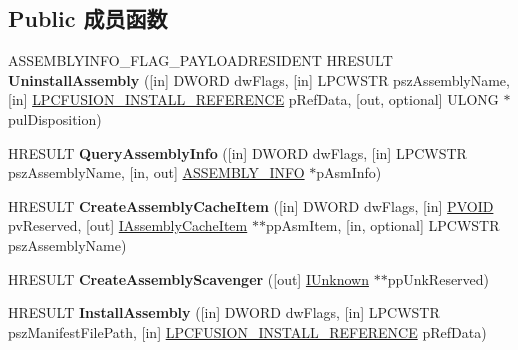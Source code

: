 \subsection*{Public 成员函数}
\begin{DoxyCompactItemize}
\item 
\mbox{\label{interface_i_assembly_cache_adfc9a0666bd7a4483c16d1b1a7648920}} 
A\+S\+S\+E\+M\+B\+L\+Y\+I\+N\+F\+O\+\_\+\+F\+L\+A\+G\+\_\+\+P\+A\+Y\+L\+O\+A\+D\+R\+E\+S\+I\+D\+E\+NT H\+R\+E\+S\+U\+LT {\bfseries Uninstall\+Assembly} (\mbox{[}in\mbox{]} D\+W\+O\+RD dw\+Flags, \mbox{[}in\mbox{]} L\+P\+C\+W\+S\+TR psz\+Assembly\+Name, \mbox{[}in\mbox{]} \hyperlink{struct_i_assembly_cache_1_1___f_u_s_i_o_n___i_n_s_t_a_l_l___r_e_f_e_r_e_n_c_e__}{L\+P\+C\+F\+U\+S\+I\+O\+N\+\_\+\+I\+N\+S\+T\+A\+L\+L\+\_\+\+R\+E\+F\+E\+R\+E\+N\+CE} p\+Ref\+Data, \mbox{[}out, optional\mbox{]} U\+L\+O\+NG $\ast$pul\+Disposition)
\item 
\mbox{\label{interface_i_assembly_cache_a7393a8a085819c8598f5aa397904a06b}} 
H\+R\+E\+S\+U\+LT {\bfseries Query\+Assembly\+Info} (\mbox{[}in\mbox{]} D\+W\+O\+RD dw\+Flags, \mbox{[}in\mbox{]} L\+P\+C\+W\+S\+TR psz\+Assembly\+Name, \mbox{[}in, out\mbox{]} \hyperlink{struct_i_assembly_cache_1_1___a_s_s_e_m_b_l_y___i_n_f_o}{A\+S\+S\+E\+M\+B\+L\+Y\+\_\+\+I\+N\+FO} $\ast$p\+Asm\+Info)
\item 
\mbox{\label{interface_i_assembly_cache_a62bf25334bbe1593ade599b8876d68ed}} 
H\+R\+E\+S\+U\+LT {\bfseries Create\+Assembly\+Cache\+Item} (\mbox{[}in\mbox{]} D\+W\+O\+RD dw\+Flags, \mbox{[}in\mbox{]} \hyperlink{interfacevoid}{P\+V\+O\+ID} pv\+Reserved, \mbox{[}out\mbox{]} \hyperlink{interface_i_assembly_cache_item}{I\+Assembly\+Cache\+Item} $\ast$$\ast$pp\+Asm\+Item, \mbox{[}in, optional\mbox{]} L\+P\+C\+W\+S\+TR psz\+Assembly\+Name)
\item 
\mbox{\label{interface_i_assembly_cache_a97bdae9f799eb089c99d71ec1c18809a}} 
H\+R\+E\+S\+U\+LT {\bfseries Create\+Assembly\+Scavenger} (\mbox{[}out\mbox{]} \hyperlink{interface_i_unknown}{I\+Unknown} $\ast$$\ast$pp\+Unk\+Reserved)
\item 
\mbox{\label{interface_i_assembly_cache_a965455f10eedae2b2737ec6edf353d9b}} 
H\+R\+E\+S\+U\+LT {\bfseries Install\+Assembly} (\mbox{[}in\mbox{]} D\+W\+O\+RD dw\+Flags, \mbox{[}in\mbox{]} L\+P\+C\+W\+S\+TR psz\+Manifest\+File\+Path, \mbox{[}in\mbox{]} \hyperlink{struct_i_assembly_cache_1_1___f_u_s_i_o_n___i_n_s_t_a_l_l___r_e_f_e_r_e_n_c_e__}{L\+P\+C\+F\+U\+S\+I\+O\+N\+\_\+\+I\+N\+S\+T\+A\+L\+L\+\_\+\+R\+E\+F\+E\+R\+E\+N\+CE} p\+Ref\+Data)

\end{DoxyCompactItemize}
